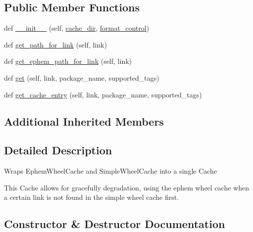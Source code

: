 \subsection*{Public Member Functions}
\begin{DoxyCompactItemize}
\item 
def \hyperlink{classpip_1_1__internal_1_1cache_1_1WheelCache_a67fa9223bc168f13ca875f35ecede301}{\+\_\+\+\_\+init\+\_\+\+\_\+} (self, \hyperlink{classpip_1_1__internal_1_1cache_1_1Cache_aed8f0121963b4d3095aaa0b2ea344012}{cache\+\_\+dir}, \hyperlink{classpip_1_1__internal_1_1cache_1_1Cache_ac6051e5c3dff9ba7c7e5968e82acc9d2}{format\+\_\+control})
\item 
def \hyperlink{classpip_1_1__internal_1_1cache_1_1WheelCache_a547a7cc2c142b1f7e971990c564658f6}{get\+\_\+path\+\_\+for\+\_\+link} (self, link)
\item 
def \hyperlink{classpip_1_1__internal_1_1cache_1_1WheelCache_aa11a3aa4d932f9e3256040837e73b997}{get\+\_\+ephem\+\_\+path\+\_\+for\+\_\+link} (self, link)
\item 
def \hyperlink{classpip_1_1__internal_1_1cache_1_1WheelCache_a722f8381e4d788924983bcfcfea9a320}{get} (self, link, package\+\_\+name, supported\+\_\+tags)
\item 
def \hyperlink{classpip_1_1__internal_1_1cache_1_1WheelCache_a26c59ef2ab9419e7f5fff1fc51382cea}{get\+\_\+cache\+\_\+entry} (self, link, package\+\_\+name, supported\+\_\+tags)
\end{DoxyCompactItemize}
\subsection*{Additional Inherited Members}


\subsection{Detailed Description}
\begin{DoxyVerb}Wraps EphemWheelCache and SimpleWheelCache into a single Cache

This Cache allows for gracefully degradation, using the ephem wheel cache
when a certain link is not found in the simple wheel cache first.
\end{DoxyVerb}
 

\subsection{Constructor \& Destructor Documentation}
\mbox{\label{classpip_1_1__internal_1_1cache_1_1WheelCache_a67fa9223bc168f13ca875f35ecede301}} 
